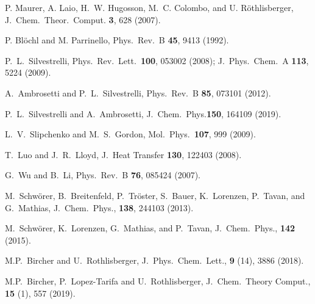 \documentclass[twoside,10pt,titlepage,a4paper]{article}
\begin{document}
\begin{thebibliography}{999}
    P. Maurer, A. Laio, H.~W. Hugosson, M.~C. Colombo, and U. R\"othlisberger,
    J.~Chem.~Theor.~Comput. {\bf 3}, 628 (2007).  

       P. Bl{\"o}chl and M. Parrinello,
      Phys.~Rev.~B {\bf 45}, 9413 (1992).

      P.~L.~Silvestrelli, Phys.~Rev.~Lett.~{\bf 100}, 053002 (2008);
       J.~Phys.~Chem.~A {\bf 113}, 5224 (2009).

     A.~Ambrosetti and P.~L.~Silvestrelli, Phys.~Rev.~B {\bf 85}, 073101 (2012).

     P.~L.~Silvestrelli and A.~Ambrosetti, J.~Chem.~Phys.{\bf 150}, 164109 (2019).

     L.~V.~Slipchenko and M.~S.~Gordon, 
     Mol.~Phys.~{\bf 107}, 999 (2009).

    T.~Luo and J.~R.~Lloyd, J.~Heat Transfer {\bf 130}, 122403 (2008).

    G.~Wu and B.~Li, Phys.~Rev.~B {\bf 76}, 085424 (2007).

M.~Schw\"{o}rer, B.~Breitenfeld, P.~Tr\"{o}ster, S.~Bauer, K.~Lorenzen, P.~Tavan, and G.~Mathias,
 J.\ Chem.\ Phys., {\bf 138},  244103  (2013).

M.~Schw\"{o}rer, K.~Lorenzen, G.~Mathias, and P.~Tavan,
 J.\ Chem.\ Phys., {\bf 142}   (2015).

M.P.~Bircher and U.~Rothlisberger,
 J.\ Phys.\ Chem.\ Lett., {\bf 9} (14), 3886 (2018).

M.P.~Bircher, P.~Lopez-Tarifa and U.~Rothlisberger,
 J.\ Chem.\ Theory Comput., {\bf 15} (1), 557 (2019).



\end{thebibliography}
%

%
%
\cleardoublepage

\renewenvironment{theindex}%
{\newpage%
\section*{Index}%
\addcontentsline{toc}{section}{Index}%
\begin{multicols}{2}%
\par\bigskip%
\begin{list}%
{}%
{%
\setlength{\leftmargin}{3em}
\setlength{\itemindent}{0pt}
\setlength{\parsep}{0pt}
\setlength{\itemsep}{0pt}
\setlength{\itemindent}{-3em}}
}%
{\end{list}\end{multicols}}%

\printindex

%
\end{document}
